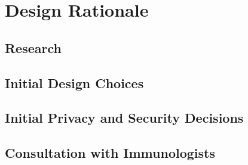 \chapter{Design Rationale}

\section{Research}

\section{Initial Design Choices}

\section{Initial Privacy and Security Decisions}

\section{Consultation with Immunologists}